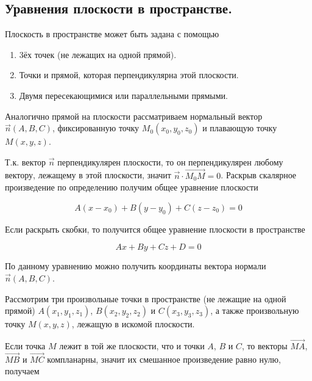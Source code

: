 \subsection{%
  Уравнения плоскости в пространстве.%
}

Плоскость в пространстве может быть задана с помощью

\begin{enumerate}
\item
  3ёх точек (не лежащих на одной прямой).
  
\item
  Точки и прямой, которая перпендикулярна этой плоскости.
  
\item
  Двумя пересекающимися или параллельными прямыми.
\end{enumerate}


Аналогично прямой на плоскости рассматриваем нормальный вектор \(\vec{n}(A, B,
C)\), фиксированную точку \(M_0 (x_0, y_0, z_0)\) и плавающую точку \(M (x, y,
z)\).

Т.к. вектор \(\vec{n}\) перпендикулярен плоскости, то он перпендикулярен любому
вектору, лежащему в этой плоскости, значит \(\vec{n} \cdot \vec{M_0M} = 0\).
Раскрыв скалярное произведение по определению получим общее уравнение плоскости

\begin{equation*}
  A (x - x_0) + B (y - y_0) + C (z - z_0) = 0    
\end{equation*}

Если раскрыть скобки, то получится общее уравнение плоскости в пространстве

\begin{equation*}
  A x + B y + C z + D = 0
\end{equation*}

\begin{remark}
  По данному уравнению можно получить координаты вектора нормали \(\vec{n}(A, B,
  C)\).
\end{remark}


Рассмотрим три произвольные точки в пространстве (не лежащие на одной прямой)
\(A (x_1, y_1, z_1)\), \(B (x_2, y_2, z_2)\) и \(C (x_3, y_3, z_3)\), а также
произвольную точку \(M (x, y, z)\), лежащую в искомой плоскости.

Если точка \(M\) лежит в той же плоскости, что и точки \(A\), \(B\) и \(C\), то
векторы \(\vec{MA}\), \(\vec{MB}\) и \(\vec{MC}\) компланарны, значит их
смешанное произведение равно нулю, получаем


